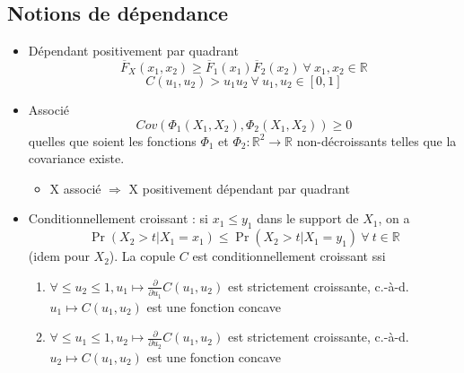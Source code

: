\subsection{Notions de dépendance}

\begin{itemize}
	\item Dépendant positivement par quadrant 
	$$\overline{F}_X(x_1, x_2) \geq \overline{F}_1(x_1)\overline{F}_2(x_2) ~\forall~ x_1, x_2 \in \mathbb{R}$$
	$$C(u_1, u_2) > u_1 u_2 ~\forall~ u_1, u_2 \in [0, 1]$$
	\item Associé
	$$Cov\left(\Phi_1(X_1, X_2), \Phi_2(X_1, X_2)\right) \geq 0$$
	quelles que soient les fonctions $\Phi_1$ et $\Phi_2 : \mathbb{R}^2 \to \mathbb{R}$ non-décroissants telles que la covariance existe. 
	\begin{itemize}
		\item X associé $\Rightarrow$ X positivement dépendant par quadrant
	\end{itemize}
	\item Conditionnellement croissant : si $x_1 \leq y_1$ dans le support de $X_1$, on a 
	$$\Pr(X_2 > t \vert X_1 = x_1) \leq \Pr(X_2 > t \vert X_1 = y_1) ~ \forall~ t \in \mathbb{R}$$
	(idem pour $X_2$). La copule $C$ est conditionnellement croissant ssi 
	\begin{enumerate}[label=\roman*)]
		\item $\displaystyle \forall\leq u_2 \leq 1, u_1 \longmapsto \frac{\partial}{\partial u_1} C(u_1, u_2)$ est strictement croissante, c.-à-d. $u_1 \longmapsto C(u_1, u_2)$ est une fonction concave
		\item $\displaystyle \forall\leq u_1 \leq 1, u_2 \longmapsto \frac{\partial}{\partial u_2} C(u_1, u_2)$ est strictement croissante, c.-à-d. $u_2 \longmapsto C(u_1, u_2)$ est une fonction concave
	\end{enumerate}
	
	
	
\end{itemize}

























































